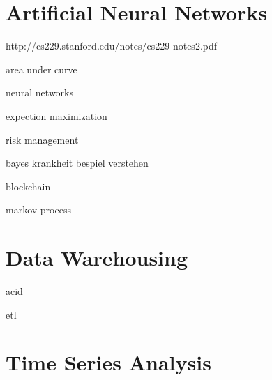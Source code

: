 \documentclass[11pt]{article}
\theoremstyle{plain}
\theoremstyle{definition}
\begin{document}
\section{Artificial Neural Networks}



http://cs229.stanford.edu/notes/cs229-notes2.pdf

area under curve

neural networks

expection maximization

risk management

bayes krankheit bespiel verstehen


blockchain

markov process


\section{Data Warehousing}
acid

etl 

\section{Time Series Analysis}
\end{document}
